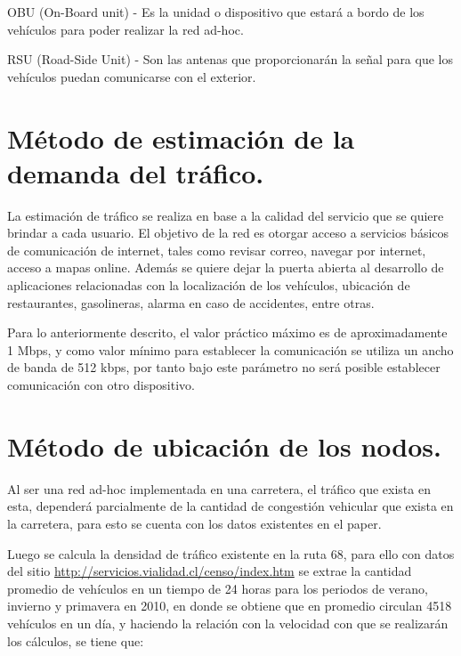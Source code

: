 \documentclass[12pt]{article}
\begin{document}
OBU (On-Board unit) - Es la unidad o dispositivo que estará a bordo de los vehículos para poder realizar 
la red ad-hoc.

RSU (Road-Side Unit) - Son las antenas que proporcionarán la señal para que los vehículos puedan comunicarse 
con el exterior.

\normalsize
\newpage
\section{Método de estimación de la demanda del tráfico.}

La estimación de tráfico se realiza en base a la calidad del servicio que se quiere brindar a cada 
usuario. El objetivo de la red es otorgar acceso a servicios básicos de comunicación de internet, tales
como revisar correo, navegar por internet, acceso a mapas on\-line. Además se quiere dejar la puerta 
abierta al desarrollo de aplicaciones relacionadas con la localización de los vehículos, ubicación de 
restaurantes, gasolineras, alarma en caso de accidentes, entre otras.

Para lo anteriormente descrito, el valor práctico máximo es de aproximadamente  1  Mbps,  y  como  
valor  mínimo  para  establecer  la comunicación se utiliza un ancho  de  banda   de  512  kbps,  por 
tanto  bajo este parámetro no será posible establecer comunicación con otro dispositivo.

\section{Método de ubicación de los nodos.}

Al ser una red ad-hoc implementada en una carretera, el tráfico que exista en esta, dependerá 
parcialmente de la cantidad de congestión vehicular que exista en la carretera, para esto se cuenta 
con los datos existentes en el paper.

Luego se calcula la densidad de tráfico existente en la ruta 68, para ello con datos del sitio 
\url{http://servicios.vialidad.cl/censo/index.htm} se extrae la cantidad promedio de vehículos en un 
tiempo de 24 horas para los periodos de verano, invierno y primavera en 2010, en donde se obtiene que 
en promedio circulan 4518 vehículos en un día, y haciendo la relación con la velocidad con que se 
realizarán los cálculos, se tiene que:\\
\end{document}

